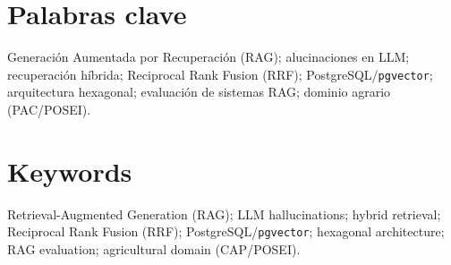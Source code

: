 \documentclass[12pt,a4paper,oneside]{report}
\begin{document}
{\begin{abstract}
The artefact is a containerised MVP: authentication, document ingest, chat with source citations, and retrieval/evaluation labs. The backend follows a hexagonal architecture on FastAPI, PostgreSQL/\texttt{pgvector}, hybrid retrieval (dense embeddings + BM25 + Reciprocal Rank Fusion) and local generation via Ollama (\texttt{llama3.2:latest}, \texttt{nomic-embed-text} embeddings). The frontend uses React, Vite and Tailwind CSS. An agentic orchestrator (LangGraph) is part of the product; the main quantitative evaluation in this work measures the hybrid retriever with a fixed top-$k$.

The experimental protocol uses a versioned gold bank of $N=35$ questions (seven categories $\times$ five items) anchored to the \texttt{asesor-canarias} corpus. In the frozen run \texttt{run\_20260819T165515Z} (35/35 successful), the hybrid retriever achieved MRR $0.8108$ and keyword coverage $0.9643$. Judged by a local LLM-as-a-Judge (1--5 scale), mean accuracy rose from $3.31$ without RAG to $4.46$ with RAG, and the binary hallucination rate fell from $0.314$ to $0.086$. RAGAS was not run in that experiment. The empirical weak spot was identifier-level traceability rather than spanning queries.

Conclusions are scoped to the MVP and that run: RAG \textbf{reduces} extrinsic hallucination risk in the evaluated cases but does not eradicate it; an automatic judge is not a substitute for human audit or production certification.
\end{abstract}

\section*{Palabras clave}
Generación Aumentada por Recuperación (RAG); alucinaciones en LLM; recuperación híbrida; Reciprocal Rank Fusion (RRF); PostgreSQL/\texttt{pgvector}; arquitectura hexagonal; evaluación de sistemas RAG; dominio agrario (PAC/POSEI).

\section*{Keywords}
Retrieval-Augmented Generation (RAG); LLM hallucinations; hybrid retrieval; Reciprocal Rank Fusion (RRF); PostgreSQL/\texttt{pgvector}; hexagonal architecture; RAG evaluation; agricultural domain (CAP/POSEI).
}

\clearpage










\appendix


\end{document}
